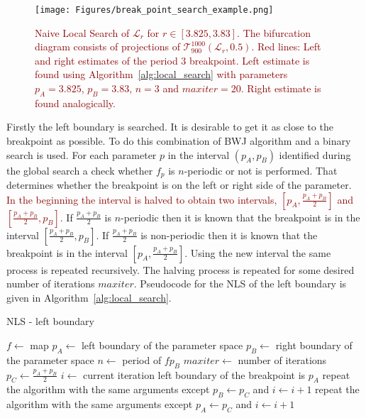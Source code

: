 \begin{figure}[!h]
    \centering
    \texttt{[image: Figures/break\_point\_search\_example.png]}
    \caption{
        \textcolor{darkred}{
        Naive Local Search of $\mathcal{L}_{r}$ for $r \in [ 3.825, 3.83 ]$.
        The bifurcation diagram consists of projections of $\mathcal{T}_{900}^{1000}(\mathcal{L}_{r}, 0.5)$.
        Red lines: Left and right estimates of the period $3$ breakpoint.
        Left estimate is found using Algorithm~\ref{alg:local_search} with parameters $p_A = 3.825$, $p_B = 3.83$, $n = 3$ and $maxiter = 20$.
        Right estimate is found analogically.
        }
    }
    \label{fig:break_point_search_example}
\end{figure}



\par
Firstly the left boundary is searched.
It is desirable to get it as close to the breakpoint as possible.
To do this combination of BWJ algorithm and a binary search is used.
For each parameter $p$ in the interval $(p_{A}, p_{B})$ identified during the global search a check whether $f_{p}$ is $n$-periodic or not is performed.
That determines whether the breakpoint is on the left or right side of the parameter.
\textcolor{darkred}{In the beginning the interval is halved to obtain two intervals, $[p_{A}, \frac{p_{A}+p_{B}}{2}]$ and $[\frac{p_{A}+p_{B}}{2}, p_{B}]$.}
If $\frac{p_{A}+p_{B}}{2}$ is $n$-periodic then it is known that the breakpoint is in the interval $[\frac{p_{A}+p_{B}}{2}, p_{B}]$.
If $\frac{p_{A}+p_{B}}{2}$ is non-periodic then it is known that the breakpoint is in the interval $[p_{A}, \frac{p_{A}+p_{B}}{2}]$.
Using the new interval the same process is repeated recursively.
The halving process is repeated for some desired number of iterations $maxiter$.
Pseudocode for the NLS of the left boundary is given in Algorithm~\ref{alg:local_search}.

\begin{algorithm}[!h]
    \caption{NLS - left boundary}
    \label{alg:local_search}
    \begin{algorithmic}[1]
        \Statex $f \gets$ map
        \Statex $p_{A} \gets$ left boundary of the parameter space
        \Statex $p_{B} \gets$ right boundary of the parameter space
        \Statex $n \gets$ period of $f{p_{B}}$
        \Statex $maxiter \gets$ number of iterations
        \State $p_{C} \gets \frac{p_{A}+p_{B}}{2}$
        \State $i \gets$ current iteration
            \State left boundary of the breakpoint is $p_{A}$
        \EndIf
            \State repeat the algorithm with the same arguments except $p_{B} \gets p_{C}$ and $i \gets i+1$
        \Else
            \State repeat the algorithm with the same arguments except $p_{A} \gets p_{C}$ and $i \gets i+1$
        \EndIf
    \end{algorithmic}
\end{algorithm}

